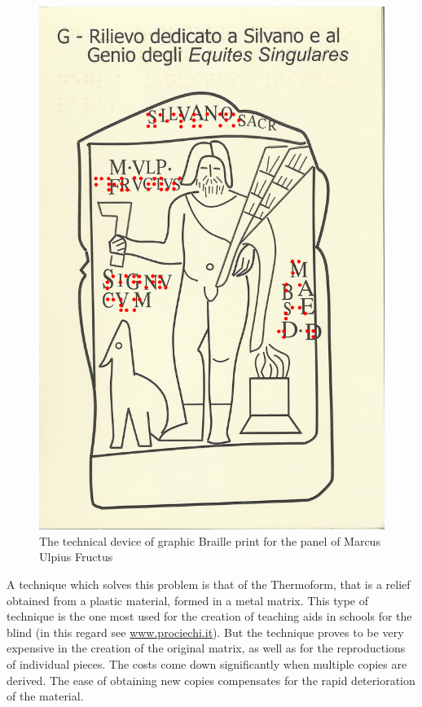 \documentclass[amsthm,ebook]{saparticle}
\begin{document}
\begin{figure}[!hbp]
\centering
 \includegraphics[width=\columnwidth]{3graphicprintBrailleMarcusUlpiusFructus.jpg}
\caption{The technical device of graphic Braille print for the panel of Marcus Ulpius Fructus}
\label{fig:3}
\end{figure}


A technique which solves this problem is that of the Thermoform, that is a relief obtained from a plastic material,
formed in a metal matrix. This type of technique is the one most used for the creation of teaching aids in schools for
the blind (in this regard see \url{www.prociechi.it}). But the technique proves to be very expensive in the creation of the
original matrix, as well as for the reproductions of individual pieces. The costs come down significantly when multiple
copies are derived. The ease of obtaining new copies compensates for the rapid deterioration of the material.
\end{document}

